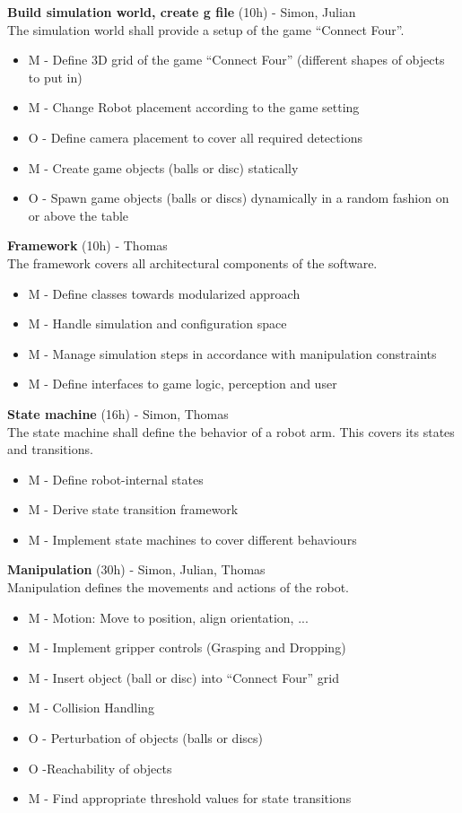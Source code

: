 \documentclass[11pt,pdftex,a4paper]{article}
\begin{document}
	\noindent
	\textbf{Build simulation world, create g file} (10h) - Simon, Julian\\
	The simulation world shall provide a setup of the game ``Connect Four''.
	\begin{itemize}
	\item M - Define 3D grid of the game ``Connect Four'' (different shapes of objects to put in)
	\item M - Change Robot placement according to the game setting
	\item O - Define camera placement to cover all required detections
	\item M - Create game objects (balls or disc) statically
	\item O - Spawn game objects (balls or discs) dynamically in a random fashion on or above the table	
	\end{itemize}
	
	\noindent
	\textbf{Framework} (10h) - Thomas\\
	The framework covers all architectural components of the software.
	\begin{itemize}
	\item M - Define classes towards modularized approach
	\item M - Handle simulation and configuration space
	\item M - Manage simulation steps in accordance with manipulation constraints
	\item M - Define interfaces to game logic, perception and user
	\end{itemize}
	
	\noindent
	\textbf{State machine} (16h) - Simon, Thomas\\
	The state machine shall define the behavior of a robot arm. This covers its states and transitions.
	\begin{itemize}
	\item M - Define robot-internal states
	\item M - Derive state transition framework
	\item M - Implement state machines to cover different behaviours 
	\end{itemize}
	
	\noindent
	\textbf{Manipulation} (30h) - Simon, Julian, Thomas\\
	Manipulation defines the movements and actions of the robot.
	\begin{itemize}
	\item M - Motion: Move to position, align orientation, ...
	\item M - Implement gripper controls (Grasping and Dropping)
	\item M - Insert object (ball or disc) into ``Connect Four'' grid
	\item M - Collision Handling
	\item O - Perturbation of objects (balls or discs) 
	\item O -Reachability of objects
	\item M - Find appropriate threshold values for state transitions
	\end{itemize}
	
\end{document}
